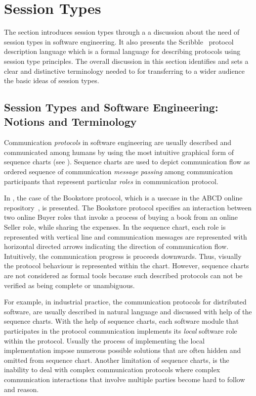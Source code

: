 \section{Session Types}
\label{sec:session_types}


The section introduces session types through a
a discussion about the need of session types in
software engineering.
It also presents the Scribble~\cite{scribble} protocol
description language which is a formal language for describing
protocols using session type principles.
The overall discussion in this section identifies and sets
a clear and distinctive terminology needed to
for transferring to a wider audience the basic ideas of session
types.

\subsection{Session Types and Software Engineering: Notions and Terminology}

Communication \emph{protocols} in software engineering
are usually described and communicated among humans
by using the most intuitive graphical form of sequence charts
(see ).
Sequence charts are used to depict communication flow as ordered
sequence of communication \emph{message passing} among communication
participants that represent particular \emph{roles} in communication
protocol.

In , the case of the Bookstore protocol, which is a usecase
in the ABCD online repository~\cite{usecase_repository},  is presented.
The Bookstore protocol specifies an interaction between two online Buyer roles
that invoke a process of buying a book from an online Seller role, while
sharing the expenses.
In the sequence chart, each role is represented with vertical line and
communication messages are represented with horizontal directed arrows
indicating the direction of communication flow.
Intuitively, the communication progress is proceeds downwards.
Thus, visually the protocol behaviour is represented within the chart.
However, sequence charts are not considered as formal tools because
such described protocols can not be verified as being complete or unambiguous.

For example, in industrial practice, the communication protocols for
distributed software, are usually described in natural language and
discussed with help of the sequence charts.
With the help of sequence charts,
each software module that participates in the
protocol communication implements
its \emph{local} software role within the protocol.
Usually the process of implementing the local implementation
impose numerous possible solutions that are often hidden and
omitted from sequence chart.
Another limitation of sequence charts, is the inability to deal with complex
communication protocols where complex communication interactions
that involve multiple parties become hard to follow and reason.

